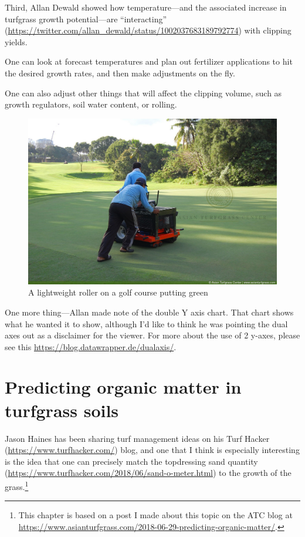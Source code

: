 \documentclass[12pt,b5,]{tufte-book}
\begin{document}
Third, Allan Dewald showed how temperature---and the associated increase in turfgrass growth potential---are ``interacting'' (\url{https://twitter.com/allan_dewald/status/1002037683189792774}) with clipping yields.

One can look at forecast temperatures and plan out fertilizer applications to hit the desired growth rates, and then make adjustments on the fly.

One can also adjust other things that will affect the clipping volume, such as growth regulators, soil water content, or rolling.

\begin{figure}
\centering
\includegraphics{img/b11-2.jpg}
\caption{A lightweight roller on a golf course putting green}
\end{figure}

One more thing---Allan made note of the double Y axis chart. That chart shows what he wanted it to show, although I'd like to think he was pointing the dual axes out as a disclaimer for the viewer. For more about the use of 2 y-axes, please see this \url{https://blog.datawrapper.de/dualaxis/}.

\hypertarget{predicting-organic-matter-in-turfgrass-soils}{%
\chapter{Predicting organic matter in turfgrass soils}\label{predicting-organic-matter-in-turfgrass-soils}}

Jason Haines has been sharing turf management ideas on his Turf Hacker (\url{https://www.turfhacker.com/}) blog, and one that I think is especially interesting is the idea that one can precisely match the topdressing sand quantity (\url{https://www.turfhacker.com/2018/06/sand-o-meter.html}) to the growth of the grass.\footnote{This chapter is based on a post I made about this topic on the ATC blog at \url{https://www.asianturfgrass.com/2018-06-29-predicting-organic-matter/}.}
\end{document}
